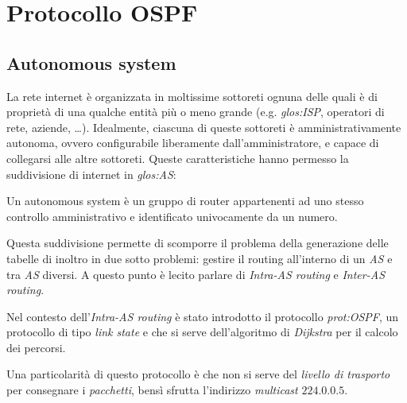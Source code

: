 \section{Protocollo OSPF}
\subsection{Autonomous system}
La rete internet è organizzata in moltissime sottoreti ognuna delle quali è di
proprietà di una qualche entità più o meno grande (e.g. \emph{\gls{glos:ISP}},
operatori di rete, aziende, \dots). Idealmente, ciascuna di queste sottoreti è
amministrativamente autonoma, ovvero configurabile liberamente dall'amministratore,
e capace di collegarsi alle altre sottoreti.
Queste caratteristiche hanno permesso la suddivisione di internet in
\emph{\gls{glos:AS}}:
\begin{definition}
    Un autonomous system è un gruppo di router appartenenti ad uno stesso
    controllo amministrativo e identificato univocamente da un numero\footnotemark.
\end{definition}
\noindent
Questa suddivisione permette di scomporre il problema della generazione delle
tabelle di inoltro in due sotto problemi: gestire il routing all'interno di un
\emph{AS} e tra \emph{AS} diversi. A questo punto è lecito parlare di
\emph{Intra-AS routing} e \emph{Inter-AS routing}.

\bigskip\noindent
Nel contesto dell'\emph{Intra-AS routing} è stato introdotto il protocollo
\emph{\gls{prot:OSPF}}, un protocollo di tipo \emph{link state} e che si serve
dell'algoritmo di \emph{Dijkstra} per il calcolo dei percorsi.

Una particolarità di questo protocollo è che non si serve del \emph{livello di
trasporto} per consegnare i \emph{pacchetti}, bensì sfrutta l'indirizzo
\emph{multicast} $224.0.0.5$.

